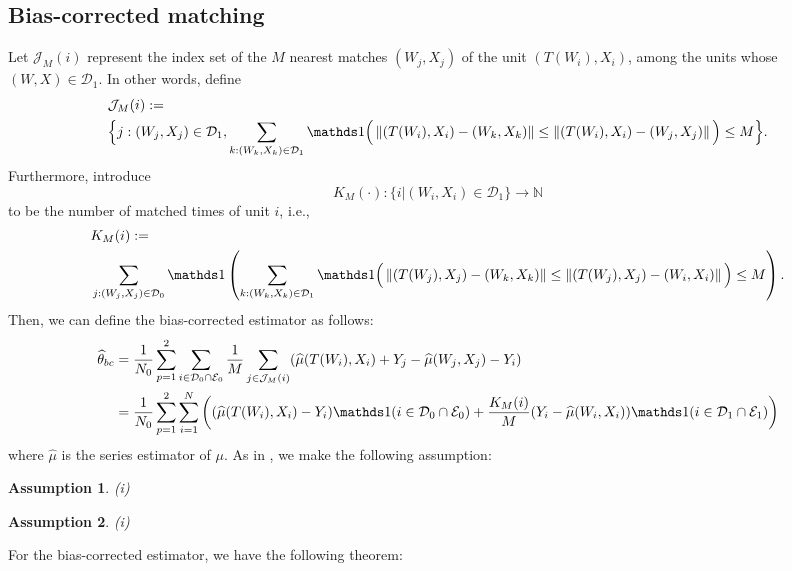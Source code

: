 \documentclass[11pt]{article}
\numberwithin{equation}{section}
\newtheorem{assumption}{Assumption}[section]
\theoremstyle{definition}
\begin{document}
\subsection{Bias-corrected matching}
Let $\mathcal{J}_{M}(i)$ represent the index set of the $M$ nearest matches $(W_j,X_j)$ of the unit $(T(W_i),X_i)$, among the units whose $(W,X)\in\mathcal{D}_1$. In other words, define 
\begin{align*}
&\mathcal{J}_{M}(i):=\notag\\
& \Big\{j: (W_j,X_j)\in\mathcal{D}_1,\sum_{k: (W_k,X_k)\in\mathcal{D}_1} \ind\Big(\left\|(T(W_i),X_i)-(W_k,X_k)\right\| \leq\left\|(T(W_i),X_i)-(W_j,X_j)\right\|\Big) \leq M\Big\}.
\end{align*}
Furthermore, introduce 
\[
K_{M}(\cdot):\Big\{i|(W_i,X_i)\in\mathcal{D}_1\Big\}\rightarrow \mathbb{N}
\]
to be the number of matched times of unit $i$, i.e.,
\begin{align*}
&K_{M}(i):=\notag\\
&\sum_{j:(W_j,X_j)\in \mathcal{D}_0} \ind\left(\sum_{k:(W_k,X_k)\in \mathcal{D}_1}\ind\Big(\left\|(T(W_j),X_j)-(W_k,X_k)\right\| \leq\left\|(T(W_j),X_j)-(W_i,X_i)\right\|\Big)\leq M\right).
\end{align*}
Then, we can define the bias-corrected estimator as follows:
\begin{align*}
    \widehat{\theta}_{bc}&=\frac{1}{N_0}\sum_{p=1}^2\sum_{i \in \mathcal{D}_0\cap\mathcal{E}_0}\frac{1}{M}\sum_{j\in \mathcal{J}_M(i)}(\widehat{\mu}(T(W_i),X_i)+Y_{j}-\widehat{\mu}(W_{j},X_{j})-Y_i)\\
    &=\frac{1}{N_0}\sum_{p=1}^2\sum_{i=1}^N\left((\widehat{\mu}(T(W_i),X_i)-Y_i)\ind(i \in \mathcal{D}_0\cap\mathcal{E}_0)+\frac{K_M(i)}{M}(Y_{i}-\widehat{\mu}(W_{i},X_{i}))\ind(i \in \mathcal{D}_1\cap\mathcal{E}_1)\right)
\end{align*}
where $\widehat{\mu}$ is the series estimator of $\mu$. As in \cite{abadie2011bias}, we make the following assumption:
\begin{assumption}\label{ass:5}
    (i) 
\end{assumption}
\begin{assumption}\label{ass:6}
    (i) 
\end{assumption}
For the bias-corrected estimator, we have the following theorem:
\end{document}
